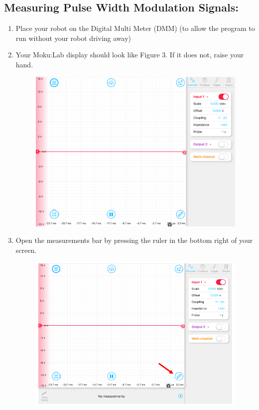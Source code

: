 \documentclass{handout}
\begin{document}
	\subsection{Measuring Pulse Width Modulation Signals:}
	\begin{enumerate}
		\item Place your robot on the Digital Multi Meter (DMM) (to allow the program to run without your robot driving away)
		\item Your Moku:Lab display should look like Figure 3. If it does not, raise your hand.
		\begin{figure} [H]
			\centering
			\includegraphics[width=.75\textwidth]{Figure5.PNG}
			\caption{}
		\end{figure}
		\newpage
	\clearpage
	\pagebreak
	
		\item Open the measurements bar by pressing the ruler in the bottom right of your screen.
		\begin{figure} [H]
			\centering
			\includegraphics[width=.75\textwidth]{Figure6.PNG}
		\end{figure}


\end{enumerate}
\end{document}
